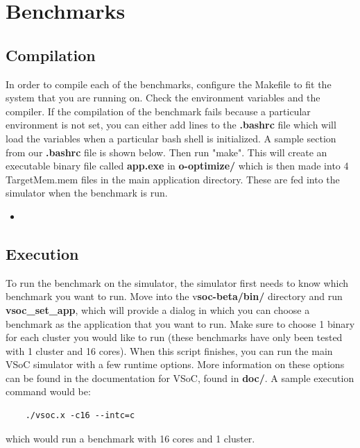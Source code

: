 \documentclass{article}
\newcommand{\bashscript}[2]{
\begin{itemize}
\item[]
\end{itemize}
}
\begin{document}
\newpage
\section{Benchmarks}
\subsection{Compilation}

In order to compile each of the benchmarks, configure the Makefile to fit the system that you 
are running on. Check the environment variables and the compiler. If the compilation of the 
benchmark fails because a particular environment is not set, you can either add lines to the 
\textbf{.bashrc} file which will load the variables when a particular bash shell is initialized.  A sample section 
from our \textbf{.bashrc} file is shown below. Then run 
"make". This will create an executable binary file called \textbf{app.exe} in \textbf{o-optimize/} which is then 
made into 4 TargetMem\*.mem files in the main application directory. These are 
fed into the simulator when the benchmark is run. 

\bashscript{bash}{Sample .bashrc file for environment variables}

\subsection{Execution}

To run the benchmark on the simulator, the simulator first needs to know which 
benchmark you want to run. Move into the v\textbf{soc-beta/bin/} directory and run 
\textbf{vsoc\_set\_app}, which will provide a dialog in which you can choose a 
benchmark as the application that you want to run.  Make sure to choose 1 
binary for each cluster you would like to run (these benchmarks have only been 
tested with 1 cluster and 16 cores). When this script finishes, you can run the 
main VSoC simulator with a few runtime options. More information on these 
options can be found in the documentation for VSoC, found in \textbf{doc/}.  
A sample execution command would be:
\begin{center}
\begin{verbatim} 
	./vsoc.x -c16 --intc=c 
\end{verbatim} 
\end{center}
which would run a benchmark with 16 cores and 1 cluster. 
\end{document}
